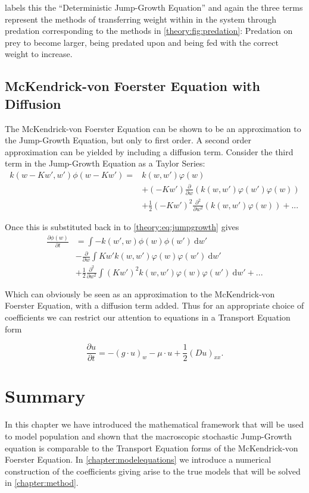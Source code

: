 \documentclass[../main]{subfiles}
\begin{document}
  \cite{datta2010} labels this the ``Deterministic Jump-Growth Equation'' and again the three terms represent the methods of transferring weight within in the system through predation corresponding to the methods in \autoref{theory:fig:predation}: Predation on prey to become larger, being predated upon and being fed with the correct weight to increase.

  \subsection{McKendrick-von Foerster Equation with Diffusion}\label{theory:sec:mvfdiffusion}
  The McKendrick-von Foerster Equation can be shown to be an approximation to the Jump-Growth Equation, but only to first order. A second order approximation can be yielded by including a diffusion term. Consider the third term in the Jump-Growth Equation as a Taylor Series:
  \begin{align}
    k(w - Kw', w')\phi(w - K w')
    = & k(w, w') \varphi(w) \nonumber \\
      & + (-K w') \frac{\partial}{\partial w} \left(k(w, w')\varphi(w')\varphi(w)\right) \nonumber \\
      & + \frac{1}{2}(-K w')^2 \frac{\partial^2}{\partial w^2} \left(k(w, w')\varphi(w)\right) + ...
  \end{align}

  Once this is substituted back in to \autoref{theory:eq:jumpgrowth} gives
  \begin{align}\label{theory:eq:jumpdiffusion}
    \frac{\partial \phi(w)}{\partial t}
    & = \int - k(w', w) \phi(w)\phi(w')  \: \mathrm{d}w' \nonumber \\
    & - \frac{\partial}{\partial w} \int K w' k(w, w')\varphi(w)\varphi(w') \: \mathrm{d}w' \nonumber \\
    & + \frac{1}{2}\frac{\partial^2}{\partial w^2} \int (K w')^2 k(w, w')\varphi(w)\varphi(w') \: \mathrm{d}w' + ...
  \end{align}

  Which can obviously be seen as an approximation to the McKendrick-von Foerster Equation, with a diffusion term added. Thus for an appropriate choice of coefficients we can restrict our attention to equations in a Transport Equation form

  \begin{equation}\label{theory:eq:jumptransport}
    \frac{\partial u}{\partial t} = - (g \cdot u)_w - \mu \cdot u + \frac{1}{2}(D u)_{xx}.
  \end{equation}

  \section{Summary}
  In this chapter we have introduced the mathematical framework that will be used to model population and shown that the macroscopic stochastic Jump-Growth equation is comparable to the Transport Equation forms of the McKendrick-von Foerster Equation. In \autoref{chapter:modelequations} we introduce a numerical construction of the coefficients giving arise to the true models that will be solved in \autoref{chapter:method}.
\end{document}
